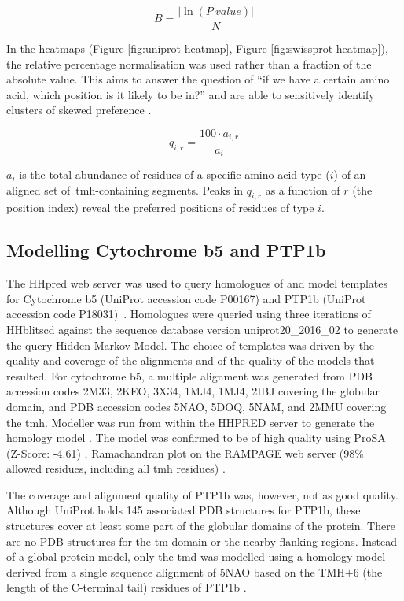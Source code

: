 \begin{equation} \label{eq:bahadur2}
B=\frac{|\ln(P~value)|}{N}
\end{equation}

In the heatmaps (Figure \ref{fig:uniprot-heatmap}, Figure \ref{fig:swissprot-heatmap}), the relative percentage normalisation was used rather than a fraction of the absolute value.
This aims to answer the question of ``if we have a certain amino acid, which position is it likely to be in?'' and are able to sensitively identify clusters of skewed preference \cite{Baker2017}.

\begin{equation} \label{eq:independent_normalisation2}
        q_{i,r}=\frac{{100}\cdot{a_{i,r}}}{a_i}
\end{equation}

$a_i$ is the total abundance of residues of a specific amino acid type ($i$) of an aligned set of~\gls{tmh}-containing segments.
Peaks in $q_{i,r}$ as a function of $r$ (the position index) reveal the preferred positions of residues of type $i$.

\subsection{Modelling Cytochrome b5 and PTP1b}
The HHpred web server was used to query homologues of and model templates for Cytochrome b5 (UniProt accession code P00167) and PTP1b (UniProt accession code P18031)~\cite{Soding 2005, Soding 2005a}.
Homologues were queried using three iterations of HHblitscd against the sequence database version uniprot20\_2016\_02 to generate the query Hidden Markov Model.
The choice of templates was driven by the quality and coverage of the alignments and of the quality of the models that resulted.
For cytochrome b5, a multiple alignment was generated from PDB accession codes 2M33, 2KEO, 3X34, 1MJ4, 1MJ4, 2IBJ covering the globular domain, and PDB accession codes 5NAO, 5DOQ, 5NAM, and 2MMU covering the \gls{tmh}.
Modeller was run from within the HHPRED server to generate the homology model \cite{Eswar2007, Zimmerman2017, Webb2016}.
The model was confirmed to be of high quality using ProSA (Z-Score: -4.61) \cite{Wiederstein2007}, Ramachandran plot on the RAMPAGE web server (98\% allowed residues, including all \gls{tmh} residues) \cite{Lovell2003}.

The coverage and alignment quality of PTP1b was, however, not as good quality.
Although UniProt holds 145 associated PDB structures for PTP1b, these structures cover at least some part of the globular domains of the protein.
There are no PDB structures for the \gls{tm} domain or the nearby flanking regions.
Instead of a global protein model, only the \gls{tmd} was modelled using a homology model derived from a single sequence alignment of 5NAO based on the TMH$\pm$6 (the length of the C-terminal tail) residues of PTP1b .

